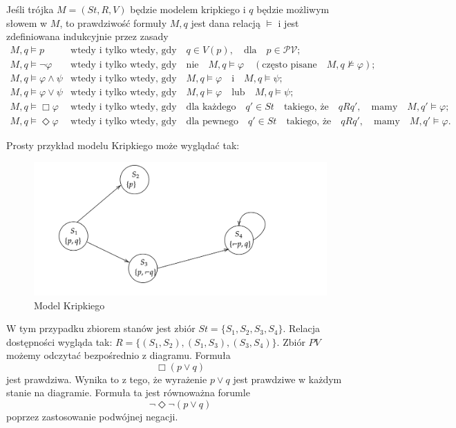 Jeśli trójka $M=(St,R,V)$ będzie modelem kripkiego i $q$ będzie możliwym słowem w $M$,
to prawdziwość formuły $M,q$ jest dana relacją $ \models $ i jest zdefiniowana indukcyjnie 
przez zasady
\[
\begin{array}{ll}
M, q \models p & \text{wtedy i tylko wtedy, gdy} \quad q \in V(p), \quad \text{dla} \quad p \in \mathcal{PV}; \\
M, q \models \neg \varphi & \text{wtedy i tylko wtedy, gdy} \quad \text{nie} \quad M, q \models \varphi \quad (\text{często pisane} \quad M, q \not\models \varphi); \\
M, q \models \varphi \land \psi & \text{wtedy i tylko wtedy, gdy} \quad M, q \models \varphi \quad \text{i} \quad M, q \models \psi; \\
M, q \models \varphi \lor \psi & \text{wtedy i tylko wtedy, gdy} \quad M, q \models \varphi \quad \text{lub} \quad M, q \models \psi; \\
M, q \models \Box \varphi & \text{wtedy i tylko wtedy, gdy} \quad \text{dla każdego} \quad q' \in St \quad \text{takiego, że} \quad q R q', \quad \text{mamy} \quad M, q' \models \varphi; \\
M, q \models \Diamond \varphi & \text{wtedy i tylko wtedy, gdy} \quad \text{dla pewnego} \quad q' \in St \quad \text{takiego, że} \quad q R q', \quad \text{mamy} \quad M, q' \models \varphi.
\end{array}
\]

Prosty przykład modelu Kripkiego może wyglądać tak:

\begin{figure}[H]
    \centering
    \includegraphics[width=\linewidth]{figures/kripke_model.png}
    \caption{Model Kripkiego}
    \label{fig:enter-label}
  \end{figure}

  W tym przypadku zbiorem stanów jest zbiór $St=\{S_{1}, S_{2}, S_{3}, S_{4}\}$.
  Relacja dostępności wygląda tak: $R=\{(S_{1}, S_{2}), (S_{1}, S_{3}), (S_{3}, S_{4})\}$.
  Zbiór $PV$ możemy odczytać bezpośrednio z diagramu. Formuła 
  \begin{equation*}
    \Box (p \lor q)
  \end{equation*}
  jest prawdziwa. Wynika to z tego, że wyrażenie $p \lor q$ jest prawdziwe w każdym stanie na diagramie.
  Formuła ta jest równoważna forumle 
  \begin{equation*}
    \neg \Diamond \neg(p \lor q)
  \end{equation*}
  poprzez zastosowanie podwójnej negacji.
